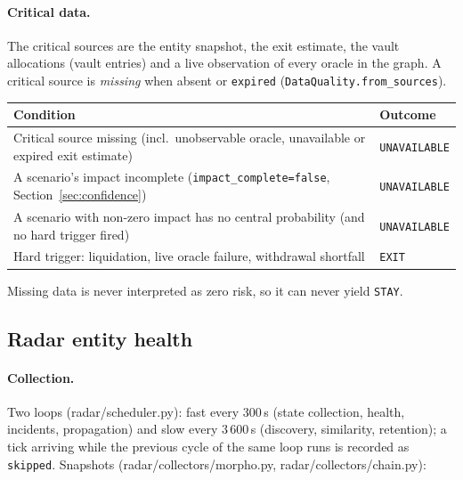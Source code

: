 \documentclass[11pt,a4paper]{article}
\newcommand{\code}[1]{\texttt{#1}}
\newcommand{\src}[1]{\textsf{\small #1}}
\begin{document}
\paragraph{Critical data.} The critical sources are the entity snapshot, the exit
estimate, the vault allocations (vault entries) and a live observation of
every oracle in the graph. A critical source is \emph{missing} when absent or
\code{expired} (\code{DataQuality.from\_sources}).

\begin{center}\small
\begin{tabularx}{\textwidth}{@{}YL{3.3cm}@{}}
\toprule
Condition & Outcome \\
\midrule
Critical source missing (incl.\ unobservable oracle, unavailable or expired exit estimate) & \code{UNAVAILABLE} \\
A scenario's impact incomplete (\code{impact\_complete=false}, Section~\ref{sec:confidence}) & \code{UNAVAILABLE} \\
A scenario with non-zero impact has no central probability (and no hard trigger fired) & \code{UNAVAILABLE} \\
Hard trigger: liquidation, live oracle failure, withdrawal shortfall & \code{EXIT} \\
\bottomrule
\end{tabularx}
\end{center}
Missing data is never interpreted as zero risk, so it can never yield
\code{STAY}.

\subsection{Radar entity health}\label{sec:health}

\paragraph{Collection.} Two loops (\src{radar/scheduler.py}): fast every 300\,s
(state collection, health, incidents, propagation) and slow every 3\,600\,s
(discovery, similarity, retention); a tick arriving while the previous cycle of
the same loop runs is recorded as \code{skipped}. Snapshots
(\src{radar/collectors/morpho.py}, \src{radar/collectors/chain.py}):
\end{document}
